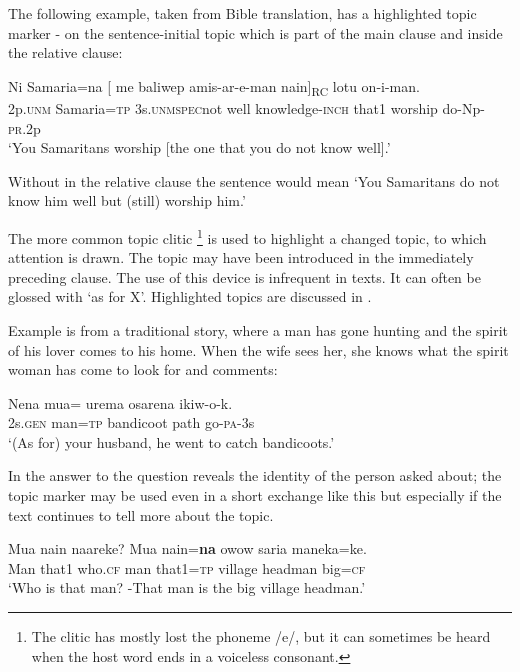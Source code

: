 The following example, taken from Bible translation, has a highlighted topic marker - on the sentence-initial topic  which is part of the main clause\textstyleAcronymallcaps{,} and  inside the relative clause:

\ea%
\label{ex:3:x1816}
\gll Ni Samaria=na [  me baliwep amis-ar-e-man nain]\textsubscript{RC} lotu on-i-man.\\
2p.\textsc{unm} Samaria=\textsc{tp} 3s.\textsc{unm}\textsc{spec}not well knowledge-\textsc{inch} that1 worship do-Np-\textsc{pr}.2p\\
\glt`You Samaritans worship [the one that you do not know well].'
\z

Without  in the relative clause the sentence would mean `You Samaritans do not know him well but (still) worship him.'

The more common topic clitic \footnote{The clitic has mostly lost the phoneme /e/, but it can sometimes be heard when the host word ends in a voiceless consonant. } is used to highlight a changed topic, to which attention is drawn. The topic may have been introduced in the immediately preceding clause. The use of this device is infrequent in texts. It can often be glossed with `as for X'. Highlighted topics are discussed in .

Example  is from a traditional story, where a man has gone hunting and the spirit of his lover comes to his home. When the wife sees her, she knows what the spirit woman has come to look for and comments:

\ea%
\label{ex:3:x779}
\gll Nena mua= urema osarena ikiw-o-k. \\
2s.\textsc{gen} man=\textsc{tp} bandicoot path go-\textsc{pa}-3s\\
\glt`(As for) your husband, he went to catch bandicoots.'
\z

In  the answer to the question reveals the identity of the person asked about; the topic marker may be used even in a short exchange like this but especially if the text continues to tell more about the topic. 

\ea%
\label{ex:3:x1751}
\gll Mua nain naareke? Mua nain=\textbf{na} owow saria maneka=ke. \\
Man that1 who.\textsc{cf} man that1=\textsc{tp} village headman big=\textsc{cf}\\
\glt`Who is that man? -That man is the big village headman.'
\z

